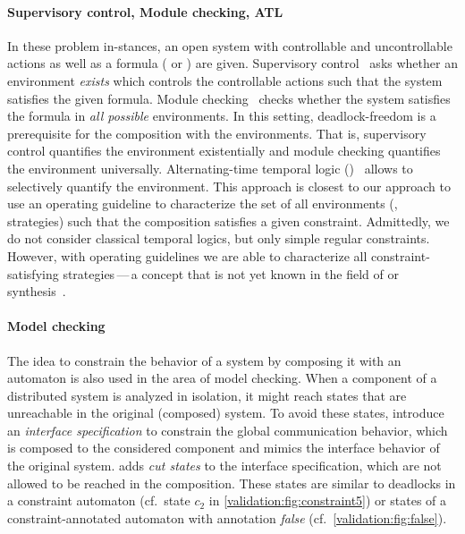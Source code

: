 \paragraph{Supervisory control, Module checking, ATL}

In these problem in-\break stances, an open system with controllable and uncontrollable actions as well as a formula ( or ) are given. Supervisory control~\cite{Ramadge87,Ramadge89} asks whether an environment \emph{exists} which controls the controllable actions such that the system satisfies the given formula. Module checking~\cite{KupfermanV_1996_cav,KupfermanVW_2001_ic, KupfermanV_2006_book} checks whether the system satisfies the formula in \emph{all possible} environments. In this setting, deadlock-freedom is a prerequisite for the composition with the environments. That is, supervisory control quantifies the environment existentially and module checking quantifies the environment universally. Alternating-time temporal logic ()~\cite{AlurHK_2002_jacm} allows to selectively quantify the environment. This approach is closest to our approach to use an operating guideline to characterize the set of all environments (\ie, strategies) such that the composition satisfies a given constraint. Admittedly, we do not consider classical temporal logics, but only simple regular constraints. However, with operating guidelines we are able to characterize all constraint-satisfying strategies\,---\,a concept that is not yet known in the field of  or  synthesis~\cite{PnueliR_1998_popl}.


\paragraph{Model checking}

The idea to constrain the behavior of a system by composing it with an automaton is also used in the area of model checking. When a component of a distributed system is analyzed in isolation, it might reach states that are unreachable in the original (composed) system. To avoid these states, \citet{GrafS90_CAV} introduce an \emph{interface specification} to constrain the global communication behavior, which is composed to the considered component and mimics the interface behavior of the original system. \citet{Valmari00_MOVEP} adds \emph{cut states} to the interface specification, which are not allowed to be reached in the composition. These states are similar to deadlocks in a constraint automaton (cf.~state $c_{2}$ in \autoref{validation:fig:constraint5}) or states of a constraint-annotated automaton with annotation \emph{false} (cf.~\autoref{validation:fig:false}).


